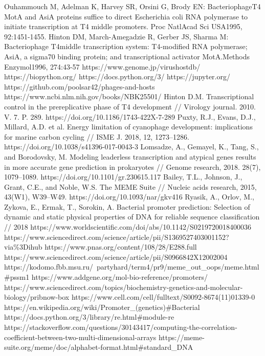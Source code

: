 \documentclass[a4paper,12pt]{article}
\begin{document}
\begin{thebibliography}{9}
     Ouhammouch M, Adelman K, Harvey SR, Orsini G, Brody EN: BacteriophageT4 MotA and AsiA proteins suffice to direct Escherichia coli RNA polymerase to initiate transcription at T4 middle promoters. Proc  NatlAcad  Sci  USA1995, 92:1451-1455.
     Hinton DM, March-Amegadzie R, Gerber JS, Sharma M: Bacteriophage T4middle transcription system: T4-modified RNA polymerase; AsiA, a sigma70 binding protein; and transcriptional activator MotA.Methods  Enzymol1996, 274:43-57
     https://www.genome.jp/virushostdb/ 
     https://biopython.org/
     https://docs.python.org/3/
     https://jupyter.org/
     https://github.com/poolsar42/phages-and-hosts
     https://www.ncbi.nlm.nih.gov/books/NBK25501/
     Hinton D.M. Transcriptional control in the prereplicative phase of T4 development // Virology
    journal. 2010. V. 7. P. 289. https://doi.org/10.1186/1743-422X-7-289
     Puxty, R.J., Evans, D.J., Millard, A.D. et al. Energy limitation of cyanophage development:
    implications for marine carbon cycling // ISME J. 2018, 12, 1273–1286. https://doi.org/10.1038/s41396-017-0043-3
     Lomsadze, A., Gemayel, K., Tang, S., and Borodovsky, M. Modeling leaderless transcription and
    atypical genes results in more accurate gene prediction in prokaryotes // Genome research,  2018. 28(7), 1079–1089.
    https://doi.org/10.1101/gr.230615.117
     Bailey, T.L., Johnson, J., Grant, C.E., and Noble, W.S. The MEME Suite // Nucleic acids research,
    2015, 43(W1), W39–W49. https://doi.org/10.1093/nar/gkv416
     Ryasik, A., Orlov, M., Zykova, E., Ermak, T., Sorokin, A. Bacterial promoter prediction: Selection
    of dynamic and static physical properties of DNA for reliable sequence classification // 2018
    https://www.worldscientific.com/doi/abs/10.1142/S0219720018400036
     https://www.sciencedirect.com/science/article/pii/S1369527403001152?via\%3Dihub
     https://www.pnas.org/content/108/28/E288.full
     https://www.sciencedirect.com/science/article/pii/S0966842X12002004
     https://kodomo.fbb.msu.ru/~partyhard/term4/pr9/meme\_out\_oops/meme.html\#pssm1
     https://www.addgene.org/mol-bio-reference/promoters/
     https://www.sciencedirect.com/topics/biochemistry-genetics-and-molecular-biology/pribnow-box
     https://www.cell.com/cell/fulltext/S0092-8674(11)01339-0
     https://en.wikipedia.org/wiki/Promoter\_(genetics)\#Bacterial
     https://docs.python.org/3/library/re.html\#module-re
     https://stackoverflow.com/questions/30143417/computing-the-correlation-coefficient-between-two-multi-dimensional-arrays
     https://meme-suite.org/meme/doc/alphabet-format.html\#standard\_DNA
\end{thebibliography}
\end{document}
